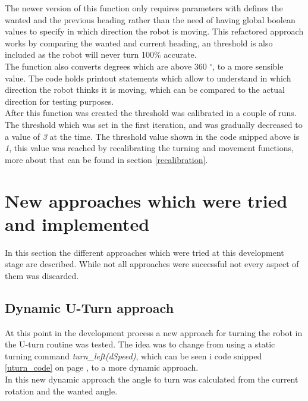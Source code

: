 The newer version of this function only requires parameters with defines the wanted and the previous heading rather than the need of having global boolean values to specify in which direction the robot is moving.
This refactored approach works by comparing the wanted and current heading, an threshold is also included as the robot will never turn 100\% accurate. \\
The function also converts degrees which are above 360 $^{\circ}$, to a more sensible value.
The code holds printout statements which allow to understand in which direction the robot thinks it is moving, which can be compared to the actual direction for testing purposes. \\[3ex]

After this function was created the threshold was calibrated in a couple of runs. The threshold which was set in the first iteration, and was gradually decreased to a value of \textit{3} at the time. The threshold value shown in the code snipped above is \textit{1}, this value was reached by recalibrating the turning and movement functions, more about that can be found in section \ref{recalibration}.

\section{New approaches which were tried and implemented}
In this section the different approaches which were tried at this development stage are described. While not all approaches were successful not every aspect of them was discarded.

\subsection{Dynamic U-Turn approach}
At this point in the development process a new approach for turning the robot in the U-turn routine was tested. The idea was to change from using a static turning command \textit{turn\_left(dSpeed)}, which can be seen i code snipped \ref{uturn_code} on page \pageref{uturn_code}, to a more dynamic approach. \\
In this new dynamic approach the angle to turn was calculated from the current rotation and the wanted angle.

